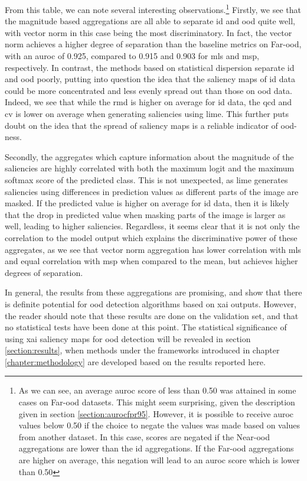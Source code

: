\documentclass[UKenglish]{uiomasterthesis} %
\theoremstyle{definition}
\begin{document}
From this table, we can note several interesting observations.\footnote{As we can see, an average \ac{auroc} score of less than 0.50 was attained in some cases on Far-\ac{ood} datasets. This might seem surprising, given the description given in section \ref{section:aurocfpr95}. However, it is possible to receive \ac{auroc} values below 0.50 if the choice to negate the values was made based on values from another dataset. In this case, scores are negated if the Near-\ac{ood} aggregations are lower than the \ac{id} aggregations. If the Far-\ac{ood} aggregations are higher on average, this negation will lead to an \ac{auroc} score which is lower than 0.50} Firstly, we see that the magnitude based aggregations are all able to separate \ac{id} and \ac{ood} quite well, with vector norm in this case being the most discriminatory. In fact, the vector norm achieves a higher degree of separation than the baseline metrics on Far-\ac{ood}, with an \ac{auroc} of 0.925, compared to 0.915 and 0.903 for \ac{mls} and \ac{msp}, respectively. In contrast, the methods based on statistical dispersion separate \ac{id} and \ac{ood} poorly, putting into question the idea that the saliency maps of \ac{id} data could be more concentrated and less evenly spread out than those on \ac{ood} data. Indeed, we see that while the \ac{rmd} is higher on average for \ac{id} data, the \ac{qcd} and \ac{cv} is lower on average when generating saliencies using \ac{lime}. This further puts doubt on the idea that the spread of saliency maps is a reliable indicator of \ac{ood}-ness.

Secondly, the aggregates which capture information about the magnitude of the saliencies are highly correlated with both the maximum logit and the maximum softmax score of the predicted class. This is not unexpected, as \ac{lime} generates saliencies using differences in prediction values as different parts of the image are masked. If the predicted value is higher on average for \ac{id} data, then it is likely that the drop in predicted value when masking parts of the image is larger as well, leading to higher saliencies. Regardless, it seems clear that it is not only the correlation to the model output which explains the discriminative power of these aggregates, as we see that vector norm aggregation has lower correlation with \ac{mls} and equal correlation with \ac{msp} when compared to the mean, but achieves higher degrees of separation.

In general, the results from these aggregations are promising, and show that there is definite potential for \ac{ood} detection algorithms based on \ac{xai} outputs. However, the reader should note that these results are done on the validation set, and that no statistical tests have been done at this point. The statistical significance of using \ac{xai} saliency maps for \ac{ood} detection will be revealed in section \ref{section:results}, when methods under the frameworks introduced in chapter \ref{chapter:methodology} are developed based on the results reported here.
\end{document}

